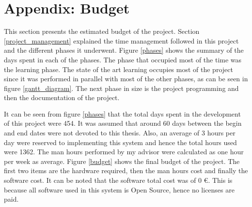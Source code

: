 	\chapter{Appendix: Budget}
		This section presents the estimated budget of the project. 
		Section \ref{project_management} explained the time management followed in this project and the different phases it underwent. 
		Figure \ref{phases} shows the summary of the days spent in each of the phases. 
		The phase that occupied most of the time was the learning phase. 
		The state of the art learning occupies most of the project since it was performed in parallel with most of the other phases, as can be seen in figure \ref{gantt_diagram}. 
		The next phase in size is the project programming and then the documentation of the project. 





		It can be seen from figure \ref{phases} that the total days spent in the development of this project were 454. 
		It was assumed that around 60 days between the begin and end dates were not devoted to this thesis. 
		Also, an average of 3 hours per day were reserved to implementing this system and hence the total hours used were 1362. 
		The man hours performed by my advisor were calculated as one hour per week as average. 
		Figure \ref{budget} shows the final budget of the project. 
		The first two items are the hardware required, then the man hours cost and finally the software cost. 
		It can be noted that the software total cost was of 0 \euro. 
		This is because all software used in this system is Open Source, hence no licenses are paid. 



